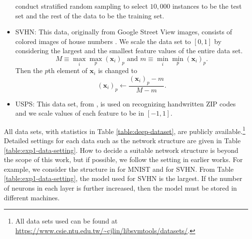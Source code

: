 \documentclass[12pt]{article}
\def\bx{{\boldsymbol x}}
\begin{document}
\begin{itemize}
conduct stratified random sampling to select $10,000$ instances to be the test set and the rest of the data to be the training set.
\item
{\sf SVHN}: This data, originally from Google Street View images, consists of colored images of house numbers \citep{YN11a}. 
We scale the data set to $[0,1]$ by considering the largest and the smallest feature values of the entire data set.
\begin{equation*}
M \equiv \max_i \max_p(\bx_i)_p \text{ and } m \equiv \min_i \min_p(\bx_i)_p.
\end{equation*}
Then the $p$th element of $\bx_i$ is changed to
\begin{equation*}
(\bx_i)_p \leftarrow \frac{(\bx_i)_p - m} {M - m}.
\end{equation*}
\item
{\sf USPS}: This data set, from \cite{JJH94a}, is used on recognizing handwritten ZIP codes and we scale values of each feature to be in $[-1,1]$. 
\end{itemize}
All data sets, with statistics in Table \ref{table:deep-dataset}, are publicly available.\footnote{All data sets used can be found at \url{https://www.csie.ntu.edu.tw/~cjlin/libsvmtools/datasets/}.} Detailed settings for each data such as the network structure are given in Table \ref{table:exp1-data-setting}.
How to decide a suitable network structure is beyond the scope of this work, but if possible, we follow the setting in earlier works.
For example, we consider the structure in \cite{LW13a} for {\sf MNIST} and \cite{BN15b} for {\sf SVHN}.
From Table \ref{table:exp1-data-setting}, the model used for {\sf SVHN} is the largest. If the number of neurons in each layer is further increased,
then the model must be stored in different machines.
\end{document}
